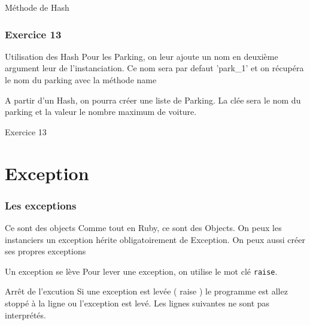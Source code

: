\documentclass{beamer}
\begin{document}
\begin{frame}
  \begin{beamerboxesrounded}{M\'ethode de Hash}
    
  \end{beamerboxesrounded}
\end{frame}

\begin{frame}
  \frametitle{Exercice 13}
  \begin{block}{Utilisation des Hash}
    Pour les Parking, on leur ajoute un nom en deuxième argument leur de
    l'instanciation. Ce nom sera par defaut 'park\_1' et on r\'ecup\'era le nom
    du parking avec la m\'ethode name

    A partir d'un Hash, on pourra cr\'eer une liste de Parking. La cl\'ee sera le
    nom du parking et la valeur le nombre maximum de voiture.
  \end{block}
\end{frame}

\begin{frame}
  \begin{beamerboxesrounded}{Exercice 13}
    
  \end{beamerboxesrounded}
\end{frame}

\section{Exception}

\begin{frame}
  \frametitle{Les exceptions}
  \begin{block}{Ce sont des objects}
    Comme tout en Ruby, ce sont des Objects. On peux les instanciers
    un exception h\'erite obligatoirement de Exception. On peux aussi cr\'eer
    ses propres exceptions
  \end{block}
  \begin{block}{Un exception se lève}
    Pour lever une exception, on utilise le mot cl\'e \verb?raise?.
  \end{block}
  \begin{block}{Arrêt de l'excution}
    Si une exception est lev\'ee ( raise ) le programme est allez stopp\'e à la
    ligne ou l'exception est lev\'e. Les lignes suivantes ne sont pas interpr\'et\'es.
  \end{block}
\end{frame}
\end{document}
